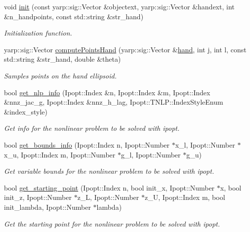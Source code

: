 \begin{DoxyCompactItemize}
\item 
void \hyperlink{classgrasping__NLP_abcf09fd329994523df9cebab0c607006}{init} (const yarp\+::sig\+::\+Vector \&objectext, yarp\+::sig\+::\+Vector \&handext, int \&n\+\_\+handpoints, const std\+::string \&str\+\_\+hand)
\begin{DoxyCompactList}\small\item\em Initialization function. \end{DoxyCompactList}\item 
yarp\+::sig\+::\+Vector \hyperlink{classgrasping__NLP_afbe118dd339bb975cd5e340fa0801cec}{compute\+Points\+Hand} (yarp\+::sig\+::\+Vector \&\hyperlink{classgrasping__NLP_abdf5321a362b6b73b54271d81e8cdd17}{hand}, int j, int l, const std\+::string \&str\+\_\+hand, double \&theta)
\begin{DoxyCompactList}\small\item\em Samples points on the hand ellipsoid. \end{DoxyCompactList}\item 
bool \hyperlink{classgrasping__NLP_a49d0b788d4d17f32efca951ed6556ca0}{get\+\_\+nlp\+\_\+info} (Ipopt\+::\+Index \&n, Ipopt\+::\+Index \&m, Ipopt\+::\+Index \&nnz\+\_\+jac\+\_\+g, Ipopt\+::\+Index \&nnz\+\_\+h\+\_\+lag, Ipopt\+::\+T\+N\+L\+P\+::\+Index\+Style\+Enum \&index\+\_\+style)
\begin{DoxyCompactList}\small\item\em Get info for the nonlinear problem to be solved with ipopt. \end{DoxyCompactList}\item 
bool \hyperlink{classgrasping__NLP_a1be828e10f1182f3befccbafdb90b577}{get\+\_\+bounds\+\_\+info} (Ipopt\+::\+Index n, Ipopt\+::\+Number $\ast$x\+\_\+l, Ipopt\+::\+Number $\ast$x\+\_\+u, Ipopt\+::\+Index m, Ipopt\+::\+Number $\ast$g\+\_\+l, Ipopt\+::\+Number $\ast$g\+\_\+u)
\begin{DoxyCompactList}\small\item\em Get variable bounds for the nonlinear problem to be solved with ipopt. \end{DoxyCompactList}\item 
bool \hyperlink{classgrasping__NLP_aad767e5f7e77a811e11817ff1d3d179e}{get\+\_\+starting\+\_\+point} (Ipopt\+::\+Index n, bool init\+\_\+x, Ipopt\+::\+Number $\ast$x, bool init\+\_\+z, Ipopt\+::\+Number $\ast$z\+\_\+L, Ipopt\+::\+Number $\ast$z\+\_\+U, Ipopt\+::\+Index m, bool init\+\_\+lambda, Ipopt\+::\+Number $\ast$lambda)
\begin{DoxyCompactList}\small\item\em Get the starting point for the nonlinear problem to be solved with ipopt. \end{DoxyCompactList}\item 

\end{DoxyCompactItemize}
